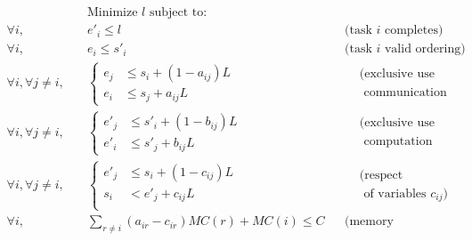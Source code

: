 \documentclass[sigconf]{acmart}
\begin{document}
	\vspace*{-0.5cm}
	\begin{align*}
		& \text{Minimize $l$ subject to:}\\
		\forall i, \quad & e'_i \leq l && \text{(task $i$ completes)}\\
		\forall i, \quad & e_i \leq s'_i&& \text{(task $i$ valid ordering)}\\
		\forall i, \forall j\ne i, \quad & \left\{\begin{aligned}
			e_j & \leq s_i +(1-a_{ij})L\\
			e_i & \leq s_j +a_{ij}L 
		\end{aligned} \right. &&
		\begin{aligned}
			&\text{(exclusive use of}\\
			&\text{  communication link)}
		\end{aligned}\\
		\forall i, \forall j\ne i, \quad & \left\{
		\begin{aligned}
			e'_j &\leq s'_i +(1-b_{ij})L\\
			e'_i &\leq s'_j +b_{ij}L
		\end{aligned}\right. && 
		\begin{aligned}
			&\text{(exclusive use of}\\
			&\text{  computation resource)}
		\end{aligned}\\
		\forall i, \forall j\ne i, \quad &\left\{
		\begin{aligned}
			e'_j &\leq s_i +(1-c_{ij})L\\
			s_i  &< e'_j +c_{ij}L\\
		\end{aligned}\right.&&
		\begin{aligned}
			&\text{(respect ordering}\\
			&\text{ of variables $c_{ij}$)}
		\end{aligned}\\
		\forall i, \quad & \sum_{r\ne i} (a_{ir} - c_{ir})MC(r) + MC(i) \le C && \text{(memory constraint)}\\
	\end{align*} 
	\vspace*{-0.75cm}
	
\end{document}
